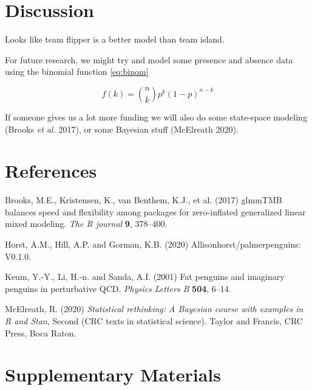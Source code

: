 \documentclass[
]{article}
\newlength{\cslhangindent}
\newenvironment{cslreferences}%
  {\setlength{\parindent}{0pt}%
  \everypar{\setlength{\hangindent}{\cslhangindent}}\ignorespaces}%
  {\par}
\begin{document}
\hypertarget{discussion}{%
\section{Discussion}\label{discussion}}

Looks like team flipper is a better model than team island.

For future research, we might try and model some presence and absence data using the binomial function \eqref{eq:binom}

\begin{equation} 
  f\left(k\right) = \binom{n}{k} p^k\left(1-p\right)^{n-k}
  \label{eq:binom}
\end{equation}

If someone gives us a lot more funding we will also do some state-space modeling (Brooks \emph{et al.} 2017), or some Bayesian stuff (McElreath 2020).

\hypertarget{references}{%
\section{References}\label{references}}

\hypertarget{refs}{}
\begin{cslreferences}
\leavevmode\hypertarget{ref-brooks2017}{}%
Brooks, M.E., Kristensen, K., van Benthem, K.J., et al. (2017) glmmTMB balances speed and flexibility among packages for zero-inflated generalized linear mixed modeling. \emph{The R journal} \textbf{9}, 378--400.

\leavevmode\hypertarget{ref-horst2020}{}%
Horst, A.M., Hill, A.P. and Gorman, K.B. (2020) Allisonhorst/palmerpenguins: V0.1.0.

\leavevmode\hypertarget{ref-keum2001}{}%
Keum, Y.-Y., Li, H.-n. and Sanda, A.I. (2001) Fat penguins and imaginary penguins in perturbative QCD. \emph{Physics Letters B} \textbf{504}, 6--14.

\leavevmode\hypertarget{ref-mcelreath2020}{}%
McElreath, R. (2020) \emph{Statistical rethinking: A Bayesian course with examples in R and Stan}, Second (CRC texts in statistical science). Taylor and Francis, CRC Press, Boca Raton.
\end{cslreferences}

\newpage

\hypertarget{supplementary-materials}{%
\section{Supplementary Materials}\label{supplementary-materials}}
\end{document}
